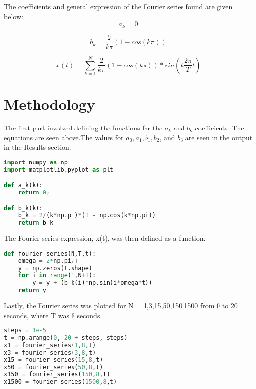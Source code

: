 \documentclass[12pt]{report}
\begin{document}
The coefficients and general expression of the Fourier series found are given below:
\begin{equation*}
a_k = 0
\end{equation*}

\begin{equation*}
b_k = \frac{2}{k\pi}(1-cos(k\pi))
\end{equation*}

\begin{equation*}
x(t) = \sum_{k=1}^{N} \frac{2}{k\pi}(1-cos(k\pi))*sin(k\frac{2\pi}{T}t)
\end{equation*}


\section{Methodology}
The first part involved defining the functions for the \(a_k\) and \(b_k\) coefficients. The equations are seen above.The values for \(a_0, a_1, b_1, b_2\), and \(b_3\) are seen in the output in the Results section.
\begin{lstlisting}[language=Python, caption=Coefficient functions]
import numpy as np
import matplotlib.pyplot as plt

def a_k(k):
    return 0;

def b_k(k):
    b_k = 2/(k*np.pi)*(1 - np.cos(k*np.pi))
    return b_k

\end{lstlisting}

The Fourier series expression, x(t), was then defined as a function.

\begin{lstlisting}[language=Python, caption=Fourier series function definition]
def fourier_series(N,T,t):
    omega = 2*np.pi/T
    y = np.zeros(t.shape)
    for i in range(1,N+1):
        y = y + (b_k(i)*np.sin(i*omega*t))
    return y
\end{lstlisting}

Lastly, the Fourier series was plotted for N = {1,3,15,50,150,1500} from 0 to 20 seconds, where T was 8 seconds.

\begin{lstlisting}[language=Python, caption=Steps and Fourier series variables that were plotted]
steps = 1e-5
t = np.arange(0, 20 + steps, steps)
x1 = fourier_series(1,8,t)
x3 = fourier_series(3,8,t)
x15 = fourier_series(15,8,t)
x50 = fourier_series(50,8,t)
x150 = fourier_series(150,8,t)
x1500 = fourier_series(1500,8,t)
\end{lstlisting}
\end{document}

